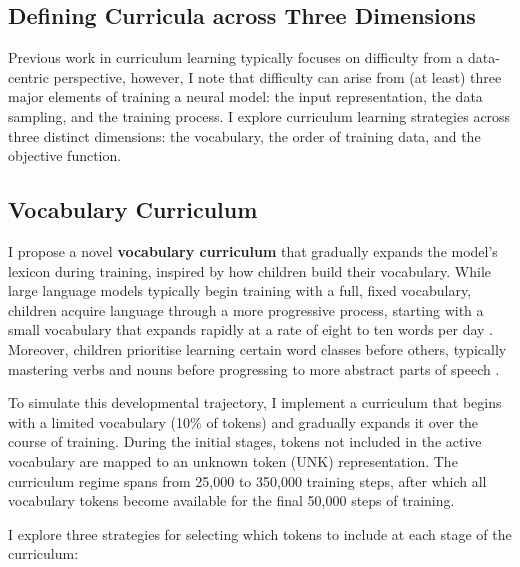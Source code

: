 \subsection{Defining Curricula across Three Dimensions}
Previous work in curriculum learning typically focuses on difficulty from a data-centric perspective, however, I note that difficulty can arise from (at least) three major elements of training a neural model: the input representation, the data sampling, and the training process. I explore curriculum learning strategies across three distinct dimensions: the vocabulary, the order of training data, and the objective function.

\subsection{Vocabulary Curriculum}
\label{subsec:vocab-cl}

I propose a novel \textbf{vocabulary curriculum} that gradually expands the model's lexicon during training, inspired by how children build their vocabulary. While large language models typically begin training with a full, fixed vocabulary, children acquire language through a more progressive process, starting with a small vocabulary that expands rapidly at a rate of eight to ten words per day \citep{weizman2001lexical}. Moreover, children prioritise learning certain word classes before others, typically mastering verbs and nouns before progressing to more abstract parts of speech \citep{bergelson2015early}.

To simulate this developmental trajectory, I implement a curriculum that begins with a limited vocabulary (10\% of tokens) and gradually expands it over the course of training. During the initial stages, tokens not included in the active vocabulary are mapped to an unknown token (\textsc{UNK}) representation. The curriculum regime spans from 25,000 to 350,000 training steps, after which all vocabulary tokens become available for the final 50,000 steps of training.

I explore three strategies for selecting which tokens to include at each stage of the curriculum:

